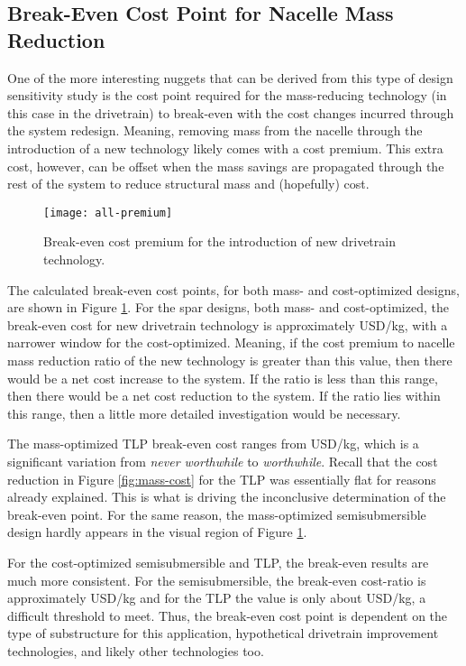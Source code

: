 \subsection{Break-Even Cost Point for Nacelle Mass Reduction}
One of the more interesting nuggets that can be derived from this type
of design sensitivity study is the cost point required for the
mass-reducing technology (in this case in the drivetrain) to break-even
with the cost changes incurred through the system redesign.  Meaning,
removing mass from the nacelle through the introduction of a new
technology likely comes with a cost premium.  This extra cost, however,
can be offset when the mass savings are propagated through the rest of
the system to reduce structural mass and (hopefully) cost.

\begin{figure}[htbp]
  \begin{center}
    \texttt{[image: all-premium]}
    \caption{Break-even cost premium for the introduction of new drivetrain
      technology.}
    \label{fig:premium}
  \end{center}
\end{figure}

The calculated break-even cost points, for both mass- and cost-optimized
designs, are shown in Figure \ref{fig:premium}.  For the spar designs,
both mass- and cost-optimized, the break-even cost for new drivetrain
technology is approximately \unit[700--1400]{USD/kg}, with a narrower
window for the cost-optimized.  Meaning, if the cost premium to nacelle
mass reduction ratio of the new technology is greater than this value,
then there would be a net cost increase to the system.  If the ratio is
less than this range, then there would be a net cost reduction to the
system.  If the ratio lies within this range, then a little more
detailed investigation would be necessary.

The mass-optimized TLP break-even cost ranges from
\unit[0--600]{USD/kg}, which is a significant variation from
\textit{never worthwhile} to \textit{worthwhile}.  Recall that the cost
reduction in Figure \ref{fig:mass-cost} for the TLP was essentially flat
for reasons already explained.  This is what is driving the inconclusive
determination of the break-even point.  For the same reason, the
mass-optimized semisubmersible design hardly appears in the visual
region of Figure \ref{fig:premium}.

For the cost-optimized semisubmersible and TLP, the break-even results
are much more consistent.  For the semisubmersible, the break-even
cost-ratio is approximately \unit[400--500]{USD/kg} and for the TLP the
value is only about \unit[100]{USD/kg}, a difficult threshold to meet.
Thus, the break-even cost point is dependent on the type of substructure
for this application, hypothetical drivetrain improvement technologies,
and likely other technologies too.

